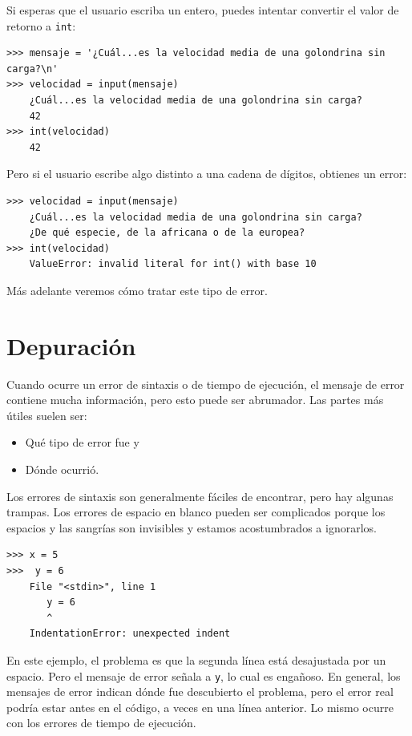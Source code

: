 \documentclass[10pt]{book}
\begin{document}
Si esperas que el usuario escriba un entero, puedes intentar convertir
el valor de retorno a {\tt int}:

\begin{verbatim}
>>> mensaje = '¿Cuál...es la velocidad media de una golondrina sin carga?\n'
>>> velocidad = input(mensaje)
    ¿Cuál...es la velocidad media de una golondrina sin carga?
    42
>>> int(velocidad)
    42
\end{verbatim}
%
Pero si el usuario escribe algo distinto a una cadena de dígitos,
obtienes un error:

\begin{verbatim}
>>> velocidad = input(mensaje)
    ¿Cuál...es la velocidad media de una golondrina sin carga?
    ¿De qué especie, de la africana o de la europea?
>>> int(velocidad)
    ValueError: invalid literal for int() with base 10
\end{verbatim}
%
Más adelante veremos cómo tratar este tipo de error.


\section{Depuración}
\label{whitespace}

Cuando ocurre un error de sintaxis o de tiempo de ejecución, el mensaje de error contiene
mucha información, pero esto puede ser abrumador.  Las partes
más útiles suelen ser:

\begin{itemize}

\item Qué tipo de error fue y

\item Dónde ocurrió.

\end{itemize}

Los errores de sintaxis son generalmente fáciles de encontrar, pero hay algunas
trampas.  Los errores de espacio en blanco pueden ser complicados porque los espacios y
las sangrías son invisibles y estamos acostumbrados a ignorarlos.

\begin{verbatim}
>>> x = 5
>>>  y = 6
    File "<stdin>", line 1
       y = 6
       ^
    IndentationError: unexpected indent
\end{verbatim}
%
En este ejemplo, el problema es que la segunda línea está desajustada por
un espacio.  Pero el mensaje de error señala a {\tt y}, lo cual es
engañoso.  En general, los mensajes de error indican dónde fue descubierto
el problema, pero el error real podría estar antes en el código,
a veces en una línea anterior. Lo mismo ocurre con los errores de tiempo de ejecución. 
\end{document}
